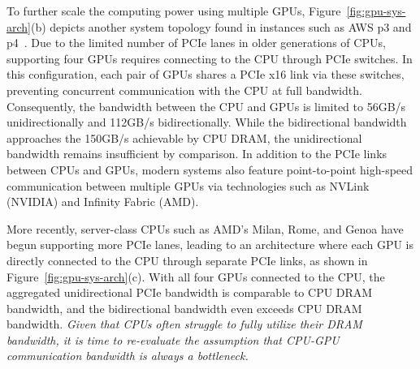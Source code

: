 To further scale the computing power using multiple GPUs, Figure~\ref{fig:gpu-sys-arch}(b) depicts another system topology found in instances such as AWS p3 and p4~\cite{aws-p3-topo, aws-p4-topo}. 
Due to the limited number of PCIe lanes in older generations of CPUs, supporting four GPUs requires connecting to the CPU through PCIe switches. 
In this configuration, each pair of GPUs shares a PCIe x16 link via these switches, preventing concurrent communication with the CPU at full bandwidth. 
Consequently, the bandwidth between the CPU and GPUs is limited to 56GB/s unidirectionally and 112GB/s bidirectionally. 
While the bidirectional bandwidth approaches the 150GB/s achievable by CPU DRAM, the unidirectional bandwidth remains insufficient by comparison.
In addition to the PCIe links between CPUs and GPUs, modern systems also feature point-to-point high-speed communication between multiple GPUs via technologies such as NVLink (NVIDIA) and Infinity Fabric (AMD).

\begin{comment}
Later, people include multiple GPU cards in each machine to further scale the computing capacity.
Figure~\ref{fig:gpu-sys-arch} (b) presents an old multi-GPU system's architecture, which can be found on machines like AWS p2/3/4.
Older-generation CPUs usually have a limited number of PCIe lanes.
To support 4 GPUs, PCIe switches are necessary.
Each pair of two GPUs shares a PCIe x16 link through PCIe switches, preventing them from concurrently communicating with the CPU at full bandwidth.
In such architecture, the bandwidth between CPU and GPU is only $\sim$56GB/s unidirectionally and $\sim$112GB/s bidirectionally.
While the bidirectional bandwidth is close to $\sim$150GB/s CPU DRAM bandwidth, the unidirectional bandwidth is still incomparable.
\end{comment}

More recently, server-class CPUs such as AMD's Milan, Rome, and Genoa have begun supporting more PCIe lanes, leading to an architecture where each GPU is directly connected to the CPU through separate PCIe links, as shown in Figure~\ref{fig:gpu-sys-arch}(c).
With all four GPUs connected to the CPU, the aggregated unidirectional PCIe bandwidth is comparable to CPU DRAM bandwidth, and the bidirectional bandwidth even exceeds CPU DRAM bandwidth. 
\textit{Given that CPUs often struggle to fully utilize their DRAM bandwidth, it is time to re-evaluate the assumption that CPU-GPU communication bandwidth is always a bottleneck.}

